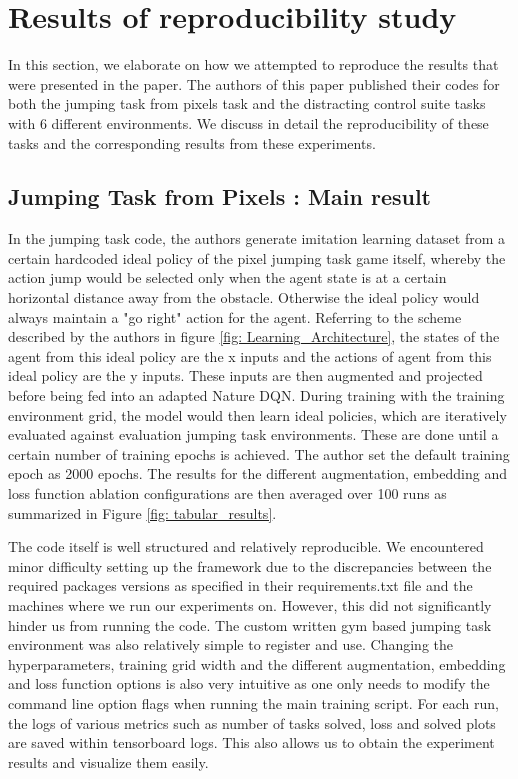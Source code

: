 \documentclass{usiinftr}
\begin{document}
\section{Results of reproducibility study}
In this section, we elaborate on how we attempted to reproduce the results that were presented in the paper. The authors of this paper published their codes for both the jumping task from pixels task and the distracting control suite tasks with 6 different environments. We discuss in detail the reproducibility of these tasks and the corresponding results from these experiments.

\subsection{Jumping Task from Pixels : Main result}
In the jumping task code, the authors generate imitation learning dataset from a certain hardcoded ideal policy of the pixel jumping task game itself, whereby the action jump would be selected only when the agent state is at a certain horizontal distance away from the obstacle. Otherwise the ideal policy would always maintain a "go right" action for the agent. Referring to the scheme described by the authors in figure \ref{fig: Learning_Architecture}, the states of the agent from this ideal policy are the x inputs and the actions of agent from this ideal policy are the y inputs. These inputs are then augmented and projected before being fed into an adapted Nature DQN. During training with the training environment grid, the model would then learn ideal policies, which are iteratively evaluated against evaluation jumping task environments. These are done until a certain number of training epochs is achieved. The author set the default training epoch as 2000 epochs. The results for the different augmentation, embedding and loss function ablation configurations are then averaged over 100 runs as summarized in Figure \ref{fig: tabular_results}.

The code itself is well structured and relatively reproducible. We encountered minor difficulty setting up the framework due to the discrepancies between the required packages versions as specified in their requirements.txt file and the machines where we run our experiments on. However, this did not significantly hinder us from running the code. The custom written gym based jumping task environment was also relatively simple to register and use. Changing the hyperparameters, training grid width and the different augmentation, embedding and loss function options is also very intuitive as one only needs to modify the command line option flags when running the main training script. For each run, the logs of various metrics such as number of tasks solved, loss and solved plots are saved within tensorboard logs. This also allows us to obtain the experiment results and visualize them easily. 
\end{document}
